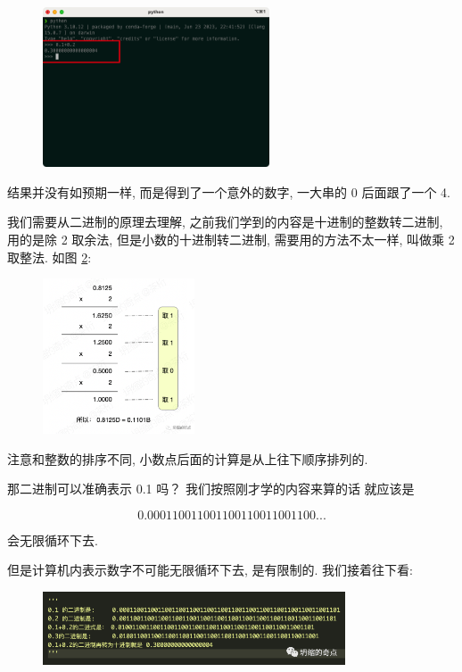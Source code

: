 \begin{figure}[ht]
  \centering\includegraphics[width=0.6\textwidth]{asset/ef878802-961f-4168-9900-da12253d4b48.png}
  \caption{}
  \label{fig:img2_15}
\end{figure}

结果并没有如预期一样, 而是得到了一个意外的数字, 一大串的 0 后面跟了一个 4.

我们需要从二进制的原理去理解, 之前我们学到的内容是十进制的整数转二进制, 用的是除 2 取余法, 但是小数的十进制转二进制, 需要用的方法不太一样, 叫做乘 2 取整法. 如图 \ref{fig:img2_16}:

\begin{figure}[ht]
  \centering
  \includegraphics[width=0.4\textwidth]{asset/20231227140841.png}
  \caption{}
  \label{fig:img2_16}
\end{figure}

注意和整数的排序不同, 小数点后面的计算是从上往下顺序排列的. 

那二进制可以准确表示 0.1 吗？ 我们按照刚才学的内容来算的话 就应该是 

\[0.000110011001100110011001100 ... \]

会无限循环下去. 

但是计算机内表示数字不可能无限循环下去, 是有限制的. 我们接着往下看:

\begin{figure}[ht]
  \centering\includegraphics[width=0.8\textwidth]{asset/20231227140947.png}
  \caption{}
  \label{fig:img2_17}
\end{figure}

